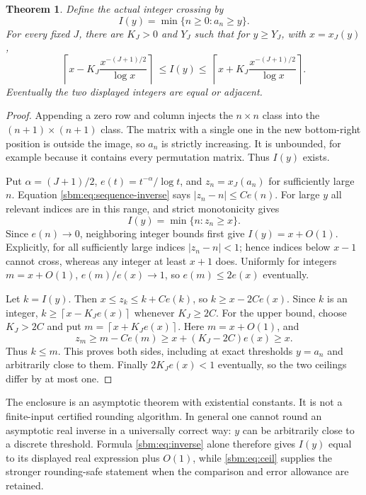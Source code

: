 \documentclass[11pt,letterpaper]{article}
\numberwithin{equation}{section}
\newtheorem{theorem}{Theorem}[section]
\theoremstyle{remark}\newtheorem{remark}[theorem]{Remark}
\newcommand{\ceil}[1]{\left\lceil #1\right\rceil}
\begin{document}
\begin{theorem}\label{sbm:thm:integer}
Define the actual integer crossing by
\[
 I(y)=\min\{n\geq0:a_n\geq y\}.
\]
For every fixed $J$, there are $K_J>0$ and $Y_J$ such that for
$y\geq Y_J$, with $x=x_J(y)$,
\begin{equation}\label{sbm:eq:ceil}
 \ceil{x-K_J\frac{x^{-(J+1)/2}}{\log x}}
 \ \leq I(y)\leq\
 \ceil{x+K_J\frac{x^{-(J+1)/2}}{\log x}}.
\end{equation}
Eventually the two displayed integers are equal or adjacent.
\end{theorem}
\begin{proof}
Appending a zero row and column injects the $n\times n$ class into the
$(n+1)\times(n+1)$ class. The matrix with a single one in the new
bottom-right position is outside the image, so $a_n$ is strictly
increasing. It is unbounded, for example because it contains every
permutation matrix. Thus $I(y)$ exists.

Put $\alpha=(J+1)/2$, $e(t)=t^{-\alpha}/\log t$, and
$z_n=x_J(a_n)$ for sufficiently large $n$. Equation
\eqref{sbm:eq:sequence-inverse} says $|z_n-n|\leq C e(n)$.
For large $y$ all relevant indices are in this range, and strict
monotonicity gives
\[
 I(y)=\min\{n:z_n\geq x\}.
\]
Since $e(n)\to0$, neighboring integer bounds first give
$I(y)=x+O(1)$. Explicitly, for all sufficiently large indices
$|z_n-n|<1$; hence indices below $x-1$ cannot cross, whereas any
integer at least $x+1$ does. Uniformly for integers $m=x+O(1)$,
$e(m)/e(x)\to1$, so $e(m)\leq2e(x)$ eventually.

Let $k=I(y)$. Then $x\leq z_k\leq k+Ce(k)$, so
$k\geq x-2Ce(x)$. Since $k$ is an integer,
$k\geq\ceil{x-K_Je(x)}$ whenever $K_J\geq2C$.
For the upper bound, choose $K_J>2C$ and put
$m=\ceil{x+K_Je(x)}$. Here $m=x+O(1)$, and
\[
 z_m\geq m-Ce(m)\geq x+(K_J-2C)e(x)\geq x.
\]
Thus $k\leq m$. This proves both sides, including at exact thresholds
$y=a_n$ and arbitrarily close to them. Finally $2K_Je(x)<1$
eventually, so the two ceilings differ by at most one.
\end{proof}

The enclosure is an asymptotic theorem with existential constants.
It is not a finite-input certified rounding algorithm. In general one
cannot round an asymptotic real inverse in a universally correct way:
$y$ can be arbitrarily close to a discrete threshold. Formula
\eqref{sbm:eq:inverse} alone therefore gives $I(y)$ equal to its displayed
real expression plus $O(1)$, while \eqref{sbm:eq:ceil} supplies the stronger
rounding-safe statement when the comparison and error allowance are
retained.
\end{document}
